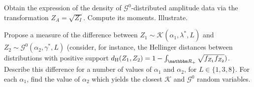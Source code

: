 \begin{exer}
Obtain the expression of the density of $\mathcal G^0$-distributed amplitude data via the transformation $Z_A=\sqrt{Z_I}$.
Compute its moments.
Illustrate.
\end{exer}

\begin{exer}
Propose a measure of the difference between $Z_1\sim\mathcal K(\alpha_1,\lambda^*, L)$ and $Z_2\sim\mathcal G^0(\alpha_2,\gamma^*, L)$ (consider, for instance, the Hellinger distances between distributions with positive support $d_{\text{H}}(Z_1,Z_2)=1-\int_{\mathbbm R_+}\sqrt{f_{Z_1} f_{Z_2}})$.
Describe this difference for a number of values of $\alpha_1$ and $\alpha_2$, for $L\in\{1,3,8\}$.
For each $\alpha_1$, find the value of $\alpha_2$ which yields the closest $\mathcal K$ and $\mathcal G^0$ random variables\cite{mejailfreryjacobobustos2001}.
\end{exer}
